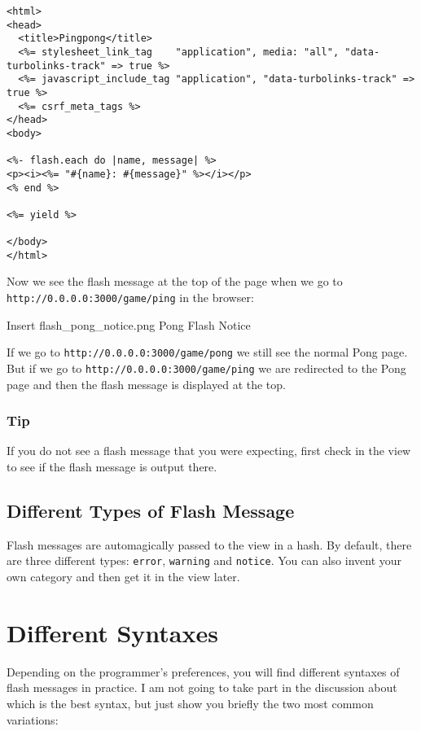 \documentclass[a4paper]{book}
\newcommand{\chap}[1]{\newpage\thispagestyle{empty}\chapter{#1}\label{chap:\thechapter}}
\begin{document}
\begin{shaded}\begin{verbatim}
<html>
<head>
  <title>Pingpong</title>
  <%= stylesheet_link_tag    "application", media: "all", "data-turbolinks-track" => true %>
  <%= javascript_include_tag "application", "data-turbolinks-track" => true %>
  <%= csrf_meta_tags %>
</head>
<body>

<%- flash.each do |name, message| %>
<p><i><%= "#{name}: #{message}" %></i></p>
<% end %>

<%= yield %>

</body>
</html>
\end{verbatim}\end{shaded}

Now we see the flash message at the top of the page when we go to \texttt{http://0.0.0.0:3000/game/ping} in the browser:

Insert flash\_pong\_notice.png Pong Flash Notice

If we go to \texttt{http://0.0.0.0:3000/game/pong} we still see the normal Pong page. But if we go to \texttt{http://0.0.0.0:3000/game/ping} we are redirected to the Pong page and then the flash message is displayed at the top.

\subsection{Tip}\label{tip-3}

If you do not see a flash message that you were expecting, first check in the view to see if the flash message is output there.

\section{Different Types of Flash Message}\label{different-types-of-flash-message}

Flash messages are automagically passed to the view in a hash. By default, there are three different types: \texttt{error}, \texttt{warning} and \texttt{notice}. You can also invent your own category and then get it in the view later.

\chap{Different Syntaxes}\label{different-syntaxes}

Depending on the programmer's preferences, you will find different syntaxes of flash messages in practice. I am not going to take part in the discussion about which is the best syntax, but just show you briefly the two most common variations:
\end{document}
